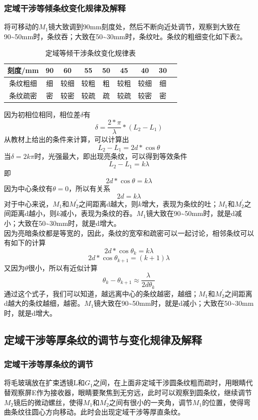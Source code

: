 \documentclass[a4paper,11pt]{article}
\begin{document}
\subsubsection{定域干涉等倾条纹变化规律及解释}
 将可移动的$M_{1}$镜大致调到90mm刻度处，然后不断向近处调节，观察到大致在90\~{}50mm时，条纹吞；大致在50\~{}30mm时，条纹吐。条纹的粗细变化如下表2。
\begin{table}[H]
	\centering\caption{定域等倾干涉条纹变化规律表}
	\small
	\begin{tabularx}{.85\linewidth}{C{1} *8{C{.5}}}
		\toprule
		\textbf{刻度/mm} &
		90 &
		60 &
		55 &
		50 &
		45 &
		40 &
		30 & \\
		\midrule
		条纹粗细     & 细  & 较细 & 较粗 &  粗 & 较粗 & 较细  & 细 \\
		条纹疏密     & 密  & 较密 & 较疏 &  疏 & 较疏 & 较密  & 密 \\
		\bottomrule
	\end{tabularx}
	\vspace{3ex}
\end{table}\noindent%
因为初相位相同，相位差$\delta$有$$\delta = \frac{2*\pi}{\lambda}*(L_{2}- L_{1})$$
从教材上给出的条件来计算，可以计算出$$L_{2}- L_{1} = 2d*\cos\theta$$
当$\delta = 2k\pi$时，光强最大，即出现亮条纹，可以得到等效条件	$$ L_{2}- L_{1} = k\lambda $$
即$$ 2d*\cos\theta = k\lambda $$
因为中心条纹有$ \theta = 0 $，所以有关系
$$ 2d = k\lambda $$
对于中心来说，$M_{1}$和$M_{2}^{\prime}$之间距离d越大，则$k$增大，表现为条纹的吐；$M_{1}$和$M_{2}^{\prime}$之间距离d越小，则$k$减小，表现为条纹的吞。$M_{1}$镜大致在90\~{}50mm时，就是d减小；大致在50\~{}30mm时，就是d增大。\\
因为亮暗条纹都是等宽的，因此，条纹的宽窄和疏密可以一起讨论，相邻条纹可以有如下的计算
$$ 2d*\cos\theta_{k} = k\lambda $$
$$ 2d*\cos\theta_{k+1} = (k+1)\lambda $$
又因为$ \theta  $很小，所以有近似计算
$$ \theta_{k} - \theta_{k+1} \approx \dfrac{\lambda}{2d\theta_{k}} $$
通过这个式子，我们可以知道，越远离中心的条纹越密，越细；$M_{1}$和$M_{2}^{\prime}$之间距离d越大的条纹越细，越密。$M_{1}$镜大致在90\~{}50mm时，就是d减小；大致在50\~{}30mm时，就是d增大。

	
\subsection{定域干涉等厚条纹的调节与变化规律及解释}
\subsubsection{定域干涉等厚条纹的调节}
将毛玻璃放在扩束透镜L和$ G_{1} $之间，在上面非定域干涉圆条纹粗而疏时，用眼睛代替观察屏E作为接收器，眼睛要聚焦到无穷远，此时可以观察到圆条纹，继续调节$M_{2}$镜后的微动螺丝，使得$M_{1}$和$M_{2}^{\prime}$之间有很小的一夹角，调节$M_{1}$的位置，使得弯曲条纹往圆心方向移动。此时会出现定域干涉等厚直条纹。
\end{document}
